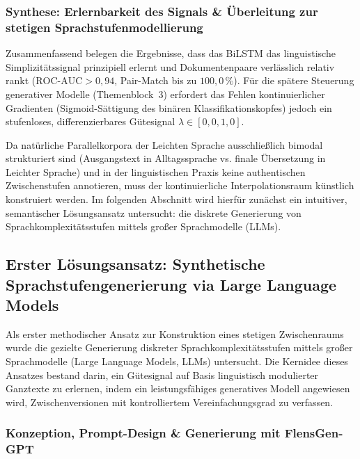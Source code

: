 \subsubsection{Synthese: Erlernbarkeit des Signals \& Überleitung zur stetigen Sprachstufenmodellierung}
\label{sec:grenzen_klassifikation_uebergang}

Zusammenfassend belegen die Ergebnisse, dass das BiLSTM das linguistische Simplizitätssignal prinzipiell erlernt und Dokumentenpaare verlässlich relativ rankt ($\text{ROC-AUC} > 0{,}94$, Pair-Match bis zu $100{,}0\,\%$). Für die spätere Steuerung generativer Modelle (Themenblock~3) erfordert das Fehlen kontinuierlicher Gradienten (Sigmoid-Sättigung des binären Klassifikationskopfes) jedoch ein stufenloses, differenzierbares Gütesignal $\lambda \in [0{,}0, 1{,}0]$.

Da natürliche Parallelkorpora der Leichten Sprache ausschließlich bimodal strukturiert sind (Ausgangstext in Alltagssprache vs. finale Übersetzung in Leichter Sprache) und in der linguistischen Praxis keine authentischen Zwischenstufen annotieren, muss der kontinuierliche Interpolationsraum künstlich konstruiert werden. Im folgenden Abschnitt wird hierfür zunächst ein intuitiver, semantischer Lösungsansatz untersucht: die diskrete Generierung von Sprachkomplexitätsstufen mittels großer Sprachmodelle (LLMs).


\subsection{Erster Lösungsansatz: Synthetische Sprachstufengenerierung via Large Language Models}
\label{sec:synthetische_sprachstufen}

Als erster methodischer Ansatz zur Konstruktion eines stetigen Zwischenraums wurde die gezielte Generierung diskreter Sprachkomplexitätsstufen mittels großer Sprachmodelle (Large Language Models, LLMs) untersucht. Die Kernidee dieses Ansatzes bestand darin, ein Gütesignal auf Basis linguistisch modulierter Ganztexte zu erlernen, indem ein leistungsfähiges generatives Modell angewiesen wird, Zwischenversionen mit kontrolliertem Vereinfachungsgrad zu verfassen.

\subsubsection{Konzeption, Prompt-Design \& Generierung mit FlensGen-GPT}
\label{sec:synthetische_generierung}

